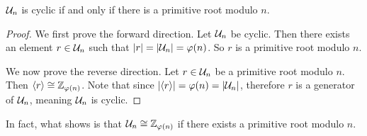 \begin{proposition}\label{prop-Un-cyclic-only-if-exists-primitive-root}
    $\mathcal{U}_{n}$ is cyclic if and only if there is a primitive root modulo $n$.
\end{proposition}
\begin{proof}
    We first prove the forward direction. Let $\mathcal{U}_{n}$ be cyclic. Then there exists an element $r \in \mathcal{U}_{n}$ such that $|r| = |\mathcal{U}_{n}| = \varphi(n)$. So $r$ is a primitive root modulo $n$.

    We now prove the reverse direction. Let $r \in \mathcal{U}_{n}$ be a primitive root modulo $n$. Then $\langle r \rangle \cong \mathbb{Z}_{\varphi(n)}$. Note that since $|\langle r \rangle| = \varphi(n) = |\mathcal{U}_{n}|$, therefore $r$ is a generator of $\mathcal{U}_{n}$, meaning $\mathcal{U}_{n}$ is cyclic.
\end{proof}
\begin{remark}
    In fact, what  shows is that $\mathcal{U}_{n} \cong \mathbb{Z}_{\varphi(n)}$ if there exists a primitive root modulo $n$.
\end{remark}

